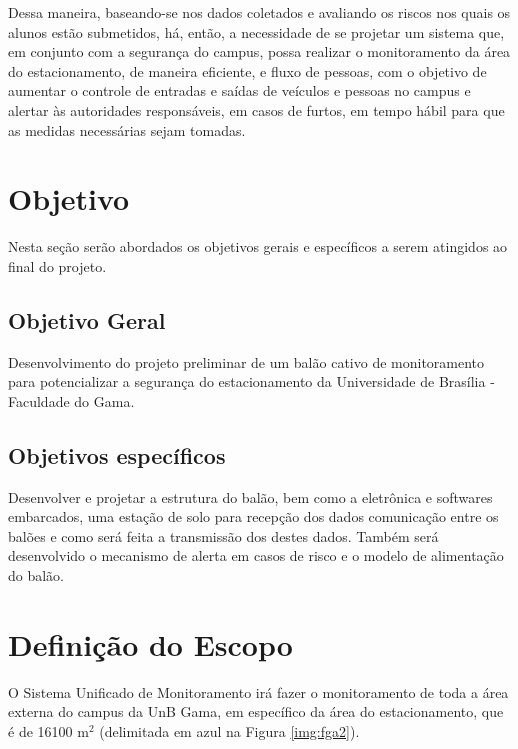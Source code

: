 Dessa maneira, baseando-se nos dados coletados e avaliando os riscos nos quais os alunos estão submetidos, há, então, a necessidade de se projetar  um sistema que, em conjunto com a segurança do campus, possa realizar o monitoramento  da área do estacionamento, de maneira eficiente, e fluxo de pessoas, com o objetivo de aumentar o controle de entradas e saídas de veículos e pessoas no campus e alertar às autoridades responsáveis, em casos de furtos, em tempo hábil para que as medidas necessárias sejam tomadas.


\section{Objetivo} %
\label{sec:objetivos}
 Nesta seção serão abordados os objetivos gerais e específicos a serem
atingidos ao final do projeto.

\subsection{Objetivo Geral}
Desenvolvimento do projeto preliminar  de um balão cativo de monitoramento para potencializar a segurança do estacionamento da Universidade de Brasília - Faculdade do Gama.

\subsection{Objetivos específicos}
Desenvolver e projetar a estrutura do balão, bem como a eletrônica e softwares embarcados, uma estação de solo para recepção dos dados comunicação entre os balões e como será feita a transmissão dos destes dados. Também será desenvolvido o mecanismo de alerta em casos de risco e o modelo de alimentação do balão.

\section{Definição do Escopo} %
\label{sec:defini_o_do_escopo}

  O Sistema Unificado de Monitoramento irá fazer o monitoramento de toda a área externa do campus da UnB Gama, em específico da área do estacionamento, que é de 16100 m$^2$ (delimitada em azul na Figura \ref{img:fga2}).

